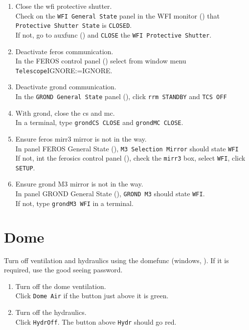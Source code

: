 \documentclass[11pt,fleqn,a4paper]{book}
\makeatletter
\def\menu#1#2{\texttt{#1}\ifx{}#2\else\@for\@x:=#2\do{$\rightarrow$\texttt{\@x}}\fi}
\def\wmenu#1#2{window menu \menu{#1}{#2}}
\makeatother
\begin{document}
\begin{enumerate}
\item Close the \gls{wfi} \gls{protective shutter}.\\
      Check on the \texttt{WFI \gls{General State}} panel in the WFI monitor () that \texttt{Protective Shutter State} is \texttt{CLOSED}.\\
      If not, go to \gls{auxfunc} () and \texttt{CLOSE} the \texttt{WFI Protective Shutter}.
\item Deactivate \gls{feros} communication.\\ 
      In the FEROS control panel () select from \wmenu{Telescope}{IGNORE}.
\item Deactivate \gls{grond} communication.\\ 
      In the \texttt{GROND \gls{General State}} panel (), click \texttt{\gls{rrm} STANDBY} and \texttt{TCS OFF}
\item With \gls{grond}, close the \gls{cs} and \gls{mc}.\\ 
      In a terminal, type \texttt{\gls{grondCS} CLOSE} and \texttt{\gls{grondMC} CLOSE}.
\item Ensure \gls{feros} \gls{mirr3} mirror is not in the way.\\
      In panel FEROS \gls{General State} (), \texttt{\gls{M3} Selection Mirror} should state \texttt{WFI}\\
      If not, int the \gls{ferosics} control panel (), check the \texttt{\gls{mirr3}} box, select \texttt{WFI}, click \texttt{SETUP}.
\item Ensure \gls{grond} \gls{M3} mirror is not in the way.\\
      In panel  GROND \gls{General State} (), \texttt{GROND \gls{M3}} should state \texttt{WFI}.\\
      If not, type \texttt{\gls{grondM3} WFI} in a terminal.
\end{enumerate}


\section{Dome}

Turn off ventilation and hydraulics using the \gls{domefunc} (\gls{windows}, ). If it is required, use the good seeing password.
\begin{enumerate}
  \item Turn off the dome ventilation.\\
        Click \texttt{Dome Air} if the button just above it is green.
  \item Turn off the hydraulics.\\
        Click \texttt{HydrOff}. The button above \texttt{Hydr} should go red. 
\end{enumerate}
\end{document}
